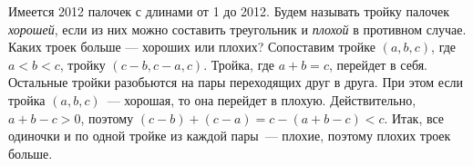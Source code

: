 \problem
Имеется 2012 палочек с длинами от 1 до 2012.
Будем называть тройку палочек \emph{хорошей}, если из них можно составить
треугольник и \emph{плохой} в противном случае.
Каких троек больше --- хороших или плохих?
\solution
Сопоставим тройке $(a, b, c)$, где $a < b < c$, тройку $(c - b, c - a, c)$.
Тройка, где $a + b = c$, перейдет в себя.
Остальные тройки разобьются на пары переходящих друг в друга.
При этом если тройка $(a, b, c)$~--- хорошая, то она перейдет в плохую.
Действительно, $a + b - c > 0$, поэтому
$(c - b) + (c - a) = c - (a + b - c) < c$.
Итак, все одиночки и по одной тройке из каждой пары~--- плохие, поэтому плохих
троек больше.
\endproblem
